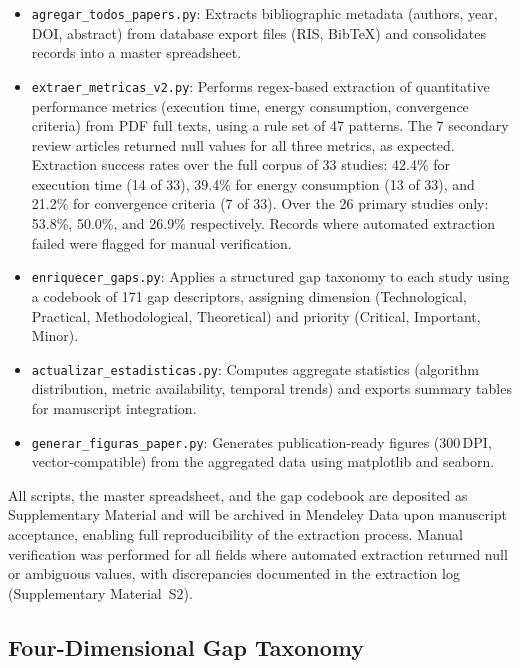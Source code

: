 \documentclass[review,3p,times]{elsarticle}
\begin{document}
\begin{itemize}
  \item \texttt{agregar\_todos\_papers.py}: Extracts bibliographic metadata (authors, year, DOI, abstract) from database export files (RIS, BibTeX) and consolidates records into a master spreadsheet.
  \item \texttt{extraer\_metricas\_v2.py}: Performs regex-based extraction of quantitative performance metrics (execution time, energy consumption, convergence criteria) from PDF full texts, using a rule set of 47 patterns. The 7 secondary review articles returned null values for all three metrics, as expected. Extraction success rates over the full corpus of 33 studies: 42.4\% for execution time (14 of 33), 39.4\% for energy consumption (13 of 33), and 21.2\% for convergence criteria (7 of 33). Over the 26 primary studies only: 53.8\%, 50.0\%, and 26.9\% respectively. Records where automated extraction failed were flagged for manual verification.
  \item \texttt{enriquecer\_gaps.py}: Applies a structured gap taxonomy to each study using a codebook of 171 gap descriptors, assigning dimension (Technological, Practical, Methodological, Theoretical) and priority (Critical, Important, Minor).
  \item \texttt{actualizar\_estadisticas.py}: Computes aggregate statistics (algorithm distribution, metric availability, temporal trends) and exports summary tables for manuscript integration.
  \item \texttt{generar\_figuras\_paper.py}: Generates publication-ready figures (300\,DPI, vector-compatible) from the aggregated data using matplotlib and seaborn.
\end{itemize}

All scripts, the master spreadsheet, and the gap codebook are deposited as Supplementary Material and will be archived in Mendeley Data upon manuscript acceptance, enabling full reproducibility of the extraction process. Manual verification was performed for all fields where automated extraction returned null or ambiguous values, with discrepancies documented in the extraction log (Supplementary Material~S2).

\subsection{Four-Dimensional Gap Taxonomy}
\end{document}
